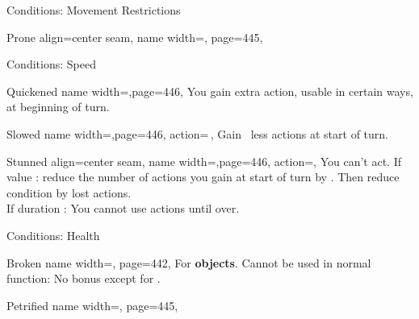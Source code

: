 \begin{PageFront}
\begin{Tables}{\frontTableHeight}
\begin{Table}{Conditions: Movement Restrictions}
\begin{entry}{Prone}{%
                align=center seam,
                name width=\conditionLength,%
                page=445,
            }
            \end{entry}
        \end{Table}
        \TableSpace
        \begin{Table}{Conditions: Speed}
            \begin{entry}{Quickened}{%
                name width=\conditionLength,page=446,
            }
                You gain  extra action, usable in certain ways, at beginning of turn.\hfill
            \end{entry}
            \breakLine
            \begin{entry}{Slowed}{%
                name width=\conditionLength,page=446,
                action=\,\X,
            }
                Gain \X\, less actions at start of turn.
            \end{entry}
            \begin{entry}{Stunned}{%
                align=center seam,
                name width=\conditionLength,page=446,
                action=\XDur,
            }
                You can't act. \hfill
                If value \X: reduce the number of actions you gain at start of turn by \X.
                Then reduce condition by lost actions.\\
                If duration \Dur: You cannot use actions until over. \hfill
            \end{entry}
        \end{Table}
    \end{Tables}%
    \begin{Tables}{\frontTableHeight}
        \begin{Table}{Conditions: Health}
            \begin{entry}{Broken}{%
                name width=\conditionLength,%
                page=442,
            }
                For \textbf{objects}. Cannot be used in normal function: No \Item bonus except for . \hfill
            \end{entry}
            \begin{entry}{Petrified}{%
                name width=\conditionLength,%
                page=445,
            }

\end{entry}
\end{Table}
\end{Tables}
\end{PageFront}
